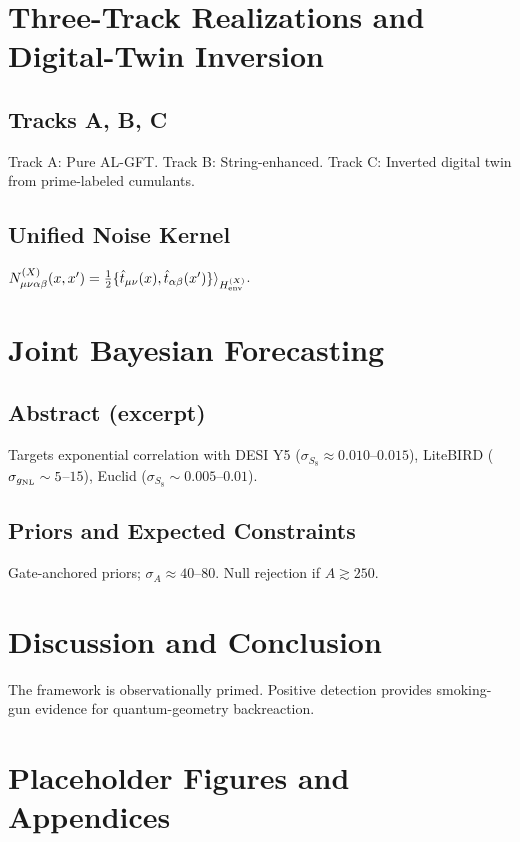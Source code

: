 \documentclass[11pt,a4paper,twoside]{article}
\begin{document}
\chapter{Three-Track Realizations and Digital-Twin Inversion}

\section{Tracks A, B, C}
Track A: Pure AL-GFT. Track B: String-enhanced. Track C: Inverted digital twin from prime-labeled cumulants.

\section{Unified Noise Kernel}
$N_{\mu\nu\alpha\beta}^{(X)}(x,x') = \frac{1}{2} \{\hat{t}_{\mu\nu}(x), \hat{t}_{\alpha\beta}(x')\}\rangle_{H_{\rm env}^{(X)}}$.

\chapter{Joint Bayesian Forecasting}

\section{Abstract (excerpt)}
Targets exponential correlation with DESI Y5 ($\sigma_{S_8} \approx 0.010$–$0.015$), LiteBIRD ($\sigma_{g_{\rm NL}} \sim 5$–$15$), Euclid ($\sigma_{S_8} \sim 0.005$–$0.01$).

\section{Priors and Expected Constraints}
Gate-anchored priors; $\sigma_A \approx 40$–$80$. Null rejection if $A \gtrsim 250$.

\chapter{Discussion and Conclusion}

The framework is observationally primed. Positive detection provides smoking-gun evidence for quantum-geometry backreaction.



\appendix
\chapter{Placeholder Figures and Appendices}
\end{document}
